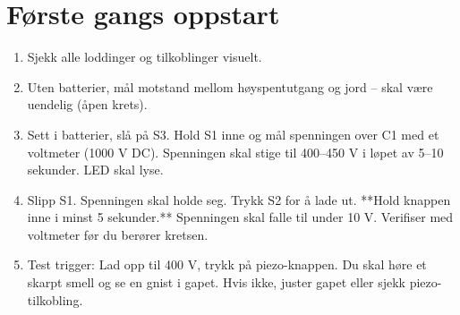 \documentclass{article}
\begin{document}
\section{Første gangs oppstart}
\begin{enumerate}
\item Sjekk alle loddinger og tilkoblinger visuelt.
\item Uten batterier, mål motstand mellom høyspentutgang og jord – skal være uendelig (åpen krets).
\item Sett i batterier, slå på S3. Hold S1 inne og mål spenningen over C1 med et voltmeter (1000 V DC). Spenningen skal stige til 400–450 V i løpet av 5–10 sekunder. LED skal lyse.
\item Slipp S1. Spenningen skal holde seg. Trykk S2 for å lade ut. **Hold knappen inne i minst 5 sekunder.** Spenningen skal falle til under 10 V. Verifiser med voltmeter før du berører kretsen.
\item Test trigger: Lad opp til 400 V, trykk på piezo-knappen. Du skal høre et skarpt smell og se en gnist i gapet. Hvis ikke, juster gapet eller sjekk piezo-tilkobling.
\end{enumerate}
\end{document}
